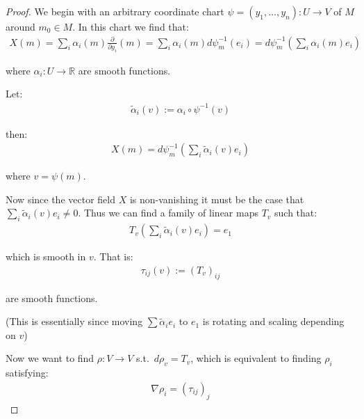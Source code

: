         \begin{proof}
                We begin with an arbitrary coordinate chart $\psi = (y_1, \ldots, y_n) : U \to V$ of $M$ around $m_0 \in M$. In this chart we find that:
                \begin{align*}
                    X(m) = \sum_i \alpha_i(m) \frac{\partial}{\partial y_i}(m) = \sum_i \alpha_i(m) d \psi_m^{-1}(e_i) = d \psi_m^{-1}\left(\sum_i \alpha_i(m) e_i\right)
                \end{align*}
    
                where $\alpha_i : U \to \mathbb{R}$ are smooth functions.
    
                Let:
                \begin{align*}
                    \tilde{\alpha}_i(v) := \alpha_i \circ \psi^{-1}(v)
                \end{align*}
    
                then:
                \begin{align*}
                    X(m) = d \psi_m^{-1}\left(\sum_i \tilde{\alpha}_i(v) e_i \right)
                \end{align*}
    
                where $v = \psi(m)$.
    
                Now since the vector field $X$ is non-vanishing it must be the case that $\sum_i \tilde{\alpha}_i(v) e_i \neq 0$. Thus we can find a family of linear maps $T_v$ such that:
                \begin{align*}
                    T_v \left(\sum_i \tilde{\alpha}_i(v) e_i\right) = e_1
                \end{align*}
    
                which is smooth in $v$. That is:
                \begin{align*}
                    \tau_{ij}(v) := (T_v)_{ij}
                \end{align*}
    
                are smooth functions.
    
                (This is essentially since moving $\sum \tilde{\alpha}_i e_i$ to $e_1$ is rotating and scaling depending on $v$)
    
                Now we want to find $\rho : V \to V$ s.t.\ $d \rho_v = T_v$, which is equivalent to finding $\rho_i$ satisfying:
                \begin{align*}
                    \nabla \rho_i = (\tau_{ij})_j
                \end{align*}
    

\end{proof}
